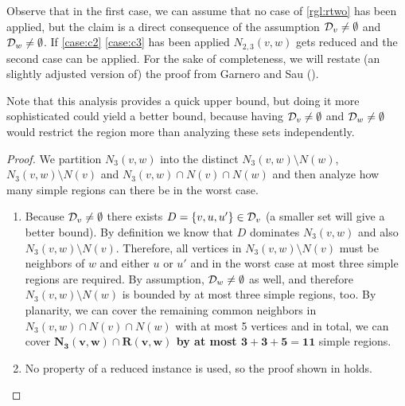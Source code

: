 Observe that in the first case, we can assume that no case of \cref{rgl:rtwo} has been applied, but the claim is a direct consequence of the assumption $\mathcal{D}_{v} \neq \emptyset$ and $\mathcal{D}_{w} \neq \emptyset$. If \cref{case:c2} \cref{case:c3} has been applied $N_{2,3}(v,w)$ gets reduced and the second case can be applied. For the sake of completeness, we will restate (an slightly adjusted version of) the proof from Garnero and Sau (\cite[Revision 2014, Fact 6]{Garnero2018}). 

Note that this analysis provides a quick upper bound, but doing it more sophisticated could yield a better bound, because having $\mathcal{D}_{v} \neq \emptyset$ and $\mathcal{D}_{w} \neq \emptyset$ would restrict the region more than analyzing these sets independently.

\begin{proof}
        We partition $N_3(v,w)$ into the distinct $N_3(v,w) \setminus N(w)$, $N_3(v,w) \setminus N(v)$ and $N_3(v,w) \cap N(v) \cap N(w)$ and then analyze how many simple regions can there be in the worst case.

    \begin{enumerate}
        \item Because $\mathcal{D}_{v} \neq \emptyset$ there exists $D = \{v,u,u'\} \in \mathcal{D}_{v}$ (a smaller set will give a better bound). By definition we know that $D$ dominates $N_3(v,w)$ and also $N_3(v,w) \setminus N(v)$. Therefore, all vertices in $N_3(v,w) \setminus N(v)$ must be neighbors of $w$ and either $u$ or $u'$ and in the worst case at most three simple regions are required. By assumption, $\mathcal{D}_{w} \neq \emptyset$ as well, and therefore $N_3(v,w) \setminus N(w)$ is bounded by at most three simple regions, too.
        By planarity, we can cover the remaining common neighbors in $N_3(v,w) \cap N(v) \cap N(w)$ with at most 5 vertices and in total, we can cover \textbf{$\mathbf{N_3(v,w) \cap R(v,w)}$ by at most $\mathbf{3 + 3 +5 = 11}$} simple regions.

        \item No property of a reduced instance is used, so the proof shown in \cite[Revision 2018]{Garnero2018} holds. 

    

\end{enumerate}
\end{proof}
